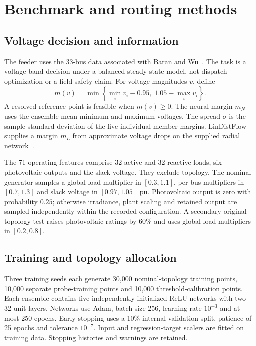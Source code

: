 \section{Benchmark and routing methods}
\label{sec:methods}

\subsection{Voltage decision and information}

The feeder uses the 33-bus data associated with Baran and Wu~\cite{baran1989reconfiguration}. The task is a voltage-band decision under a balanced steady-state model, not dispatch optimization or a field-safety claim. For voltage magnitudes $v$, define
\begin{equation}
 m(v)=\min\!\left\{\min_i v_i-0.95,\;1.05-\max_i v_i\right\}.
 \label{eq:margin}
\end{equation}
A resolved reference point is feasible when $m(v)\geq0$. The neural margin $m_N$ uses the ensemble-mean minimum and maximum voltages. The spread $\sigma$ is the sample standard deviation of the five individual member margins. LinDistFlow supplies a margin $m_L$ from approximate voltage drops on the supplied radial network~\cite{baran1989reconfiguration,turitsyn2011}.

The 71 operating features comprise 32 active and 32 reactive loads, six photovoltaic outputs and the slack voltage. They exclude topology. The nominal generator samples a global load multiplier in $[0.3,1.1]$, per-bus multipliers in $[0.7,1.3]$ and slack voltage in $[0.97,1.05]$ pu. Photovoltaic output is zero with probability $0.25$; otherwise irradiance, plant scaling and retained output are sampled independently within the recorded configuration. A secondary original-topology test raises photovoltaic ratings by $60\%$ and uses global load multipliers in $[0.2,0.8]$.

\subsection{Training and topology allocation}

Three training seeds each generate 30,000 nominal-topology training points, 10,000 separate probe-training points and 10,000 threshold-calibration points. Each ensemble contains five independently initialized ReLU networks with two 32-unit layers. Networks use Adam, batch size 256, learning rate $10^{-3}$ and at most 250 epochs. Early stopping uses a 10\% internal validation split, patience of 25 epochs and tolerance $10^{-7}$. Input and regression-target scalers are fitted on training data. Stopping histories and warnings are retained.

